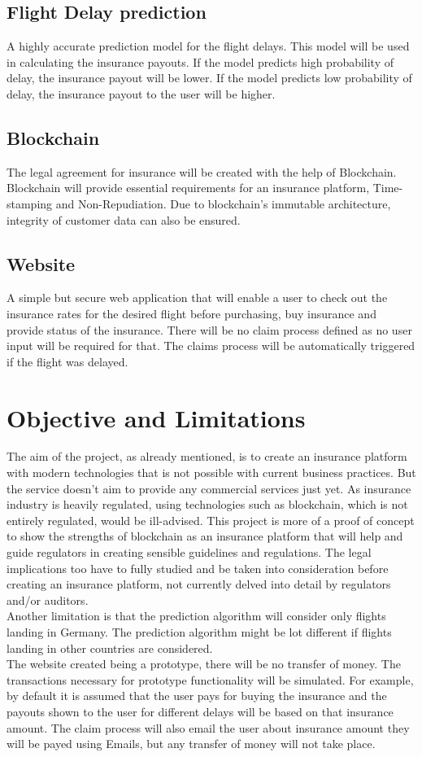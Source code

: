     \subsection{Flight Delay prediction}
    A highly accurate prediction model for the flight delays. This model will be used in calculating the insurance payouts. If the model predicts high probability of delay, the insurance payout will be lower. If the model predicts low probability of delay, the insurance payout to the user will be higher.
    \subsection{Blockchain}
    The legal agreement for insurance will be created with the help of Blockchain. Blockchain will provide essential requirements for an insurance platform, Time-stamping and Non-Repudiation. Due to blockchain's immutable architecture, integrity of customer data can also be ensured.
    \subsection{Website}
    A simple but secure web application that will enable a user to check out the insurance rates for the desired flight before purchasing, buy insurance and provide status of the insurance. There will be no claim process defined as no user input will be required for that. The claims process will be automatically triggered if the flight was delayed.

\section{Objective and Limitations}
The aim of the project, as already mentioned, is to create an insurance platform with modern technologies that is not possible with current business practices. But the service doesn't aim to provide any commercial services just yet. As insurance industry is heavily regulated, using technologies such as blockchain, which is not entirely regulated, would be ill-advised. This project is more of a proof of concept to show the strengths of blockchain as an insurance platform that will help and guide regulators in creating sensible guidelines and regulations. The legal implications too have to fully studied and be taken into consideration before creating an insurance platform, not currently delved into detail by regulators and/or auditors.
\\Another limitation is that the prediction algorithm will consider only flights landing in Germany. The prediction algorithm might be lot different if flights landing in other countries are considered.
\\The website created being a prototype, there will be no transfer of money. The transactions necessary for prototype functionality will be simulated. For example, by default it is assumed that the user pays  for buying the insurance and the payouts shown to the user for different delays will be based on that insurance amount. The claim process will also email the user about insurance amount they will be payed using Emails, but any transfer of money will not take place.